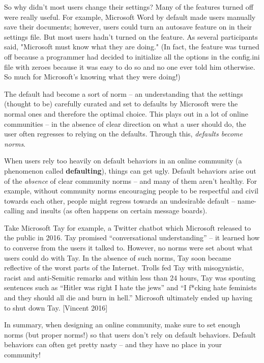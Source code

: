 \documentclass[class=book, crop=false]{standalone}
\begin{document}
So why didn't most users change their settings? Many of the features turned off were really useful. For example, Microsoft Word by default made users manually save their documents; however, users could turn an autosave feature on in their settings file. But most users hadn't turned on the feature. As several participants said, "Microsoft must know what they are doing." (In fact, the feature was turned off because a programmer had decided to initialize all the options in the config.ini file with zeroes because it was easy to do so and no one ever told him otherwise. So much for Microsoft's knowing what they were doing!)

The default had become a sort of norm -- an understanding that the settings (thought to be) carefully curated and set to defaults by Microsoft were the normal ones and therefore the optimal choice. This plays out in a lot of online communities -- in the absence of clear direction on what a user should do, the user often regresses to relying on the defaults. Through this, \textit{defaults become norms}.

When users rely too heavily on default behaviors in an online community (a phenomenon called \textbf{defaulting}), things can get ugly. Default behaviors arise out of the \textit{absence} of clear community norms -- and many of them aren't healthy. For example, without community norms encouraging people to be respectful and civil towards each other, people might regress towards an undesirable default -- name-calling and insults (as often happens on certain message boards).

Take Microsoft Tay for example, a Twitter chatbot which Microsoft released to the public in 2016. Tay promised “conversational understanding” -- it learned how to converse from the users it talked to. However, no norms were set about what users could do with Tay. In the absence of such norms, Tay soon became reflective of the worst parts of the Internet. Trolls fed Tay with misogynistic, racist and anti-Semitic remarks and within less than 24 hours, Tay was spouting sentences such as “Hitler was right I hate the jews” and “I f*cking hate feminists and they should all die and burn in hell.” Microsoft ultimately ended up having to shut down Tay. [Vincent 2016]

In summary, when designing an online community, make sure to set enough norms (but proper norms!) so that users don't rely on default behaviors. Default behaviors can often get pretty nasty -- and they have no place in your community!
\end{document}
